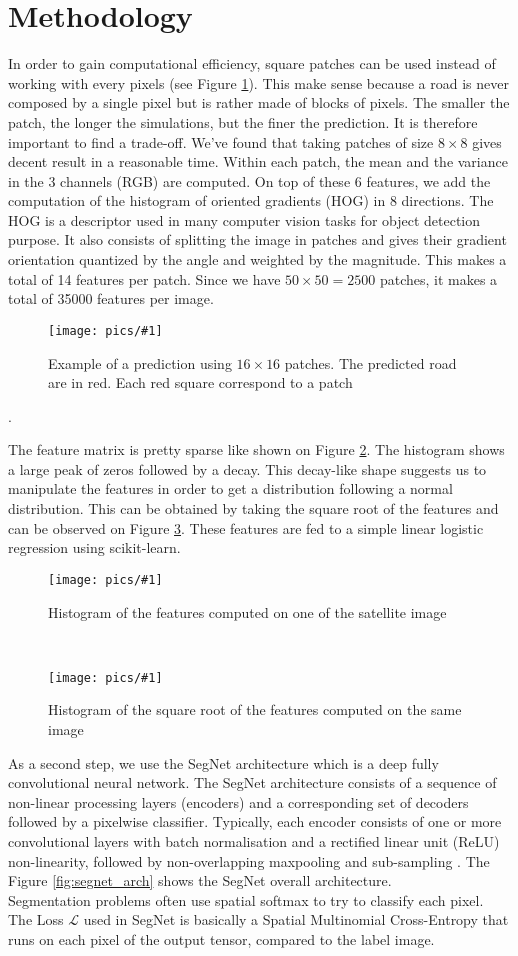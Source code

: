 \documentclass[10pt,conference,compsocconf]{IEEEtran}
\newcommand{\scalefig}[4]{
  \begin{figure}[ht!]
    \centering
    \texttt{[image: pics/\#1]}
 \caption{#3}
    \label{#4}
  \end{figure}}
\newcommand{\Lagr}{\mathcal{L}}
\begin{document}
\section{Methodology}
In order to gain computational efficiency, square patches can be used instead of working with every pixels (see Figure \ref{fig:prediction_patch}). This make sense because a road is never composed by a single pixel but is rather made of blocks of pixels. The smaller the patch, the longer the simulations, but the finer the prediction. It is therefore important to find a trade-off. We've found that taking patches of size $8 \times 8$ gives decent result in a reasonable time. Within each patch, the mean and the variance in the 3 channels (RGB) are computed. On top of these 6 features, we add  the computation of the histogram of oriented gradients (HOG) in 8 directions. The HOG is a descriptor used in many computer vision tasks for object detection purpose. It also consists of splitting the image in patches and gives their gradient orientation quantized by the angle and weighted by the magnitude. This makes a total of 14 features per patch. Since we have $50 \times 50 = 2500$ patches, it makes a total of 35000 features per image.\\
\scalefig{prediction_patch}{0.8}{Example of a prediction using $16 \times 16$ patches. The predicted road are in red. Each red square correspond to a patch}{fig:prediction_patch}.


The feature matrix is pretty sparse like shown on Figure \ref{fig:hist_feats}. The histogram shows a large peak of zeros followed by a decay. This decay-like shape suggests us to manipulate the features in order to get a distribution following a normal distribution. This can be obtained by taking the square root of the features and can be observed on Figure \ref{fig:hist_sqrt_feats}.
These features are fed to a simple linear logistic regression using scikit-learn.\\
\scalefig{hist_feats}{1}{Histogram of the features computed on one of the satellite image}{fig:hist_feats}\\
\scalefig{hist_sqrt_feats}{1}{Histogram of the square root of the features computed on the same image}{fig:hist_sqrt_feats}

As a second step, we use the SegNet architecture which is a deep fully convolutional neural network. The SegNet architecture consists of a sequence of non-linear processing layers (encoders) and a corresponding set of decoders followed by a pixelwise classifier. Typically, each encoder consists of one or more convolutional layers with batch normalisation and a rectified linear unit (ReLU) non-linearity, followed by non-overlapping maxpooling and sub-sampling  \cite{segnet2}. The Figure \ref{fig:segnet_arch} shows the SegNet overall architecture.\\
Segmentation problems often use spatial softmax to try to classify each pixel. The Loss $\Lagr$ used in SegNet is basically a Spatial Multinomial Cross-Entropy that runs on each pixel of the output tensor, compared to the label image.
\end{document}
